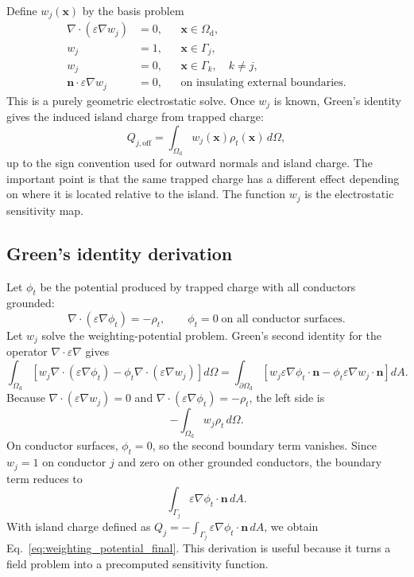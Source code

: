 \documentclass[11pt]{article}
\newcommand{\nvecb}{\mathbf{n}}
\newcommand{\Omd}{\Omega_{\mathrm{d}}}
\begin{document}
Define $w_j(\mathbf{x})$ by the basis problem
\begin{align}
\nabla\cdot(\varepsilon\nabla w_j)&=0, && \mathbf{x}\in\Omd,\\
w_j&=1, && \mathbf{x}\in\Gamma_j,\\
w_j&=0, && \mathbf{x}\in\Gamma_k,\quad k\ne j,\\
\nvecb\cdot\varepsilon\nabla w_j&=0, && \text{on insulating external boundaries.}
\end{align}
This is a purely geometric electrostatic solve. Once $w_j$ is known, Green's identity gives the induced island charge from trapped charge:
\begin{equation}
\boxed{Q_{j,\mathrm{off}}=\int_{\Omd} w_j(\mathbf{x})\rho_t(\mathbf{x})\,d\Omega,}
\label{eq:weighting_potential_final}
\end{equation}
up to the sign convention used for outward normals and island charge. The important point is that the same trapped charge has a different effect depending on where it is located relative to the island. The function $w_j$ is the electrostatic sensitivity map.

\subsection{Green's identity derivation}

Let $\phi_t$ be the potential produced by trapped charge with all conductors grounded:
\begin{equation}
\nabla\cdot(\varepsilon\nabla\phi_t)=-\rho_t,
\qquad
\phi_t=0\;\text{on all conductor surfaces}.
\end{equation}
Let $w_j$ solve the weighting-potential problem. Green's second identity for the operator $\nabla\cdot\varepsilon\nabla$ gives
\begin{equation}
\int_{\Omd}\left[w_j\nabla\cdot(\varepsilon\nabla\phi_t)-\phi_t\nabla\cdot(\varepsilon\nabla w_j)\right]d\Omega
=\int_{\partial\Omd}\left[w_j\varepsilon\nabla\phi_t\cdot\nvecb-\phi_t\varepsilon\nabla w_j\cdot\nvecb\right]dA.
\end{equation}
Because $\nabla\cdot(\varepsilon\nabla w_j)=0$ and $\nabla\cdot(\varepsilon\nabla\phi_t)=-\rho_t$, the left side is
\begin{equation}
-\int_{\Omd}w_j\rho_t\,d\Omega.
\end{equation}
On conductor surfaces, $\phi_t=0$, so the second boundary term vanishes. Since $w_j=1$ on conductor $j$ and zero on other grounded conductors, the boundary term reduces to
\begin{equation}
\int_{\Gamma_j}\varepsilon\nabla\phi_t\cdot\nvecb\,dA.
\end{equation}
With island charge defined as $Q_j=-\int_{\Gamma_j}\varepsilon\nabla\phi_t\cdot\nvecb\,dA$, we obtain Eq.~\eqref{eq:weighting_potential_final}. This derivation is useful because it turns a field problem into a precomputed sensitivity function.
\end{document}
